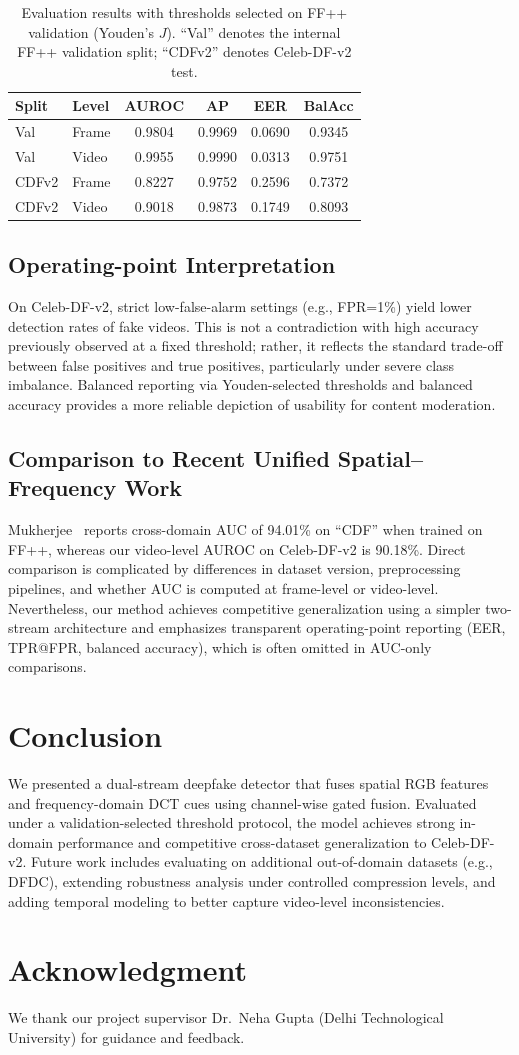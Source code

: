 \documentclass[conference]{IEEEtran}
\begin{document}
\begin{table}[t]
\centering
\caption{Evaluation results with thresholds selected on FF++ validation (Youden's $J$). ``Val'' denotes the internal FF++ validation split; ``CDFv2'' denotes Celeb-DF-v2 test.}
\label{tab:main}
\begin{tabular}{llcccc}
\toprule
\textbf{Split} & \textbf{Level} & \textbf{AUROC} & \textbf{AP} & \textbf{EER} & \textbf{BalAcc} \\
\midrule
Val & Frame & 0.9804 & 0.9969 & 0.0690 & 0.9345 \\
Val & Video & 0.9955 & 0.9990 & 0.0313 & 0.9751 \\
\midrule
CDFv2 & Frame & 0.8227 & 0.9752 & 0.2596 & 0.7372 \\
CDFv2 & Video & 0.9018 & 0.9873 & 0.1749 & 0.8093 \\
\bottomrule
\end{tabular}
\end{table}

\subsection{Operating-point Interpretation}
On Celeb-DF-v2, strict low-false-alarm settings (e.g., FPR=1\%) yield lower detection rates of fake videos. This is not a contradiction with high accuracy previously observed at a fixed threshold; rather, it reflects the standard trade-off between false positives and true positives, particularly under severe class imbalance. Balanced reporting via Youden-selected thresholds and balanced accuracy provides a more reliable depiction of usability for content moderation.

\subsection{Comparison to Recent Unified Spatial--Frequency Work}
Mukherjee~\cite{mukherjee2026unified} reports cross-domain AUC of 94.01\% on ``CDF'' when trained on FF++, whereas our video-level AUROC on Celeb-DF-v2 is 90.18\%. Direct comparison is complicated by differences in dataset version, preprocessing pipelines, and whether AUC is computed at frame-level or video-level. Nevertheless, our method achieves competitive generalization using a simpler two-stream architecture and emphasizes transparent operating-point reporting (EER, TPR@FPR, balanced accuracy), which is often omitted in AUC-only comparisons.

\section{Conclusion}
We presented a dual-stream deepfake detector that fuses spatial RGB features and frequency-domain DCT cues using channel-wise gated fusion. Evaluated under a validation-selected threshold protocol, the model achieves strong in-domain performance and competitive cross-dataset generalization to Celeb-DF-v2. Future work includes evaluating on additional out-of-domain datasets (e.g., DFDC), extending robustness analysis under controlled compression levels, and adding temporal modeling to better capture video-level inconsistencies.

\section*{Acknowledgment}
We thank our project supervisor Dr.\ Neha Gupta (Delhi Technological University) for guidance and feedback.



\end{document}
